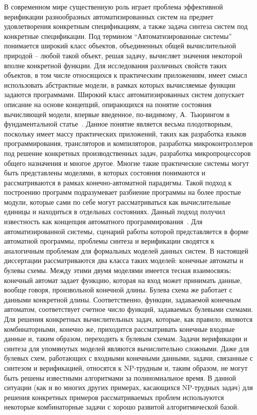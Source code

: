 \actuality
%
В современном мире существенную роль играет проблема эффективной верификации разнообразных автоматизированных систем на предмет удовлетворения конкретным спецификациям, а также задача синтеза систем под конкретные спецификации.
Под термином \enquote{Автоматизированные системы} понимается широкий класс объектов, объединенных общей вычислительной природой \--- любой такой объект, решая задачу, вычисляет значения некоторой вполне конкретной функции.
Для исследования различных свойств таких объектов, в том числе относящихся к практическим приложениям, имеет смысл использовать абстрактные модели, в рамках которых вычисляемые функции задаются программами.
Широкий класс автоматизированных систем допускает описание на основе концепций, опирающихся на понятие состояния вычисляющей модели, впервые введенное, по-видимому, А.~Тьюрингом в фундаментальной статье~\autocite{turing1937}.
Данное понятие является весьма плодотворным, поскольку имеет массу практических приложений, таких как разработка языков программирования, трансляторов и компиляторов, разработка микроконтроллеров под решение конкретных производственных задач, разработка микропроцессоров общего назначения и многое другое.
Многие такие практические системы могут быть представлены моделями, в которых состояния понимаются и рассматриваются в рамках конечно-автоматной парадигмы.
Такой подход к построению программ подразумевает разбиение программы на более простые модули, которые сами по себе могут рассматриваться как вычислительные единицы и находиться в отдельных состояниях. Данный подход получил известность как концепция автоматного программирования~\autocite{polikarpova2009}.
Для автоматизированной системы, сценарий работы которой представляется в форме автоматной программы, проблемы синтеза и верификации сводятся к аналогичным проблемам для формальных моделей данных систем. В настоящей диссертации рассматриваются два класса таких моделей: конечные автоматы и булевы схемы. Между этими двумя моделями имеется тесная взаимосвязь: конечный автомат задает функцию, которая на вход может принимать данные, вообще говоря, произвольной конечной длины. Булева схема же работает с данными конкретной длины. Соответственно, функции, задаваемой конечным автоматом, соответствует счетное число функций, задаваемых булевыми схемами. Для решения конкретных вычислительных задач, которые, как правило, являются комбинаторными, конечно же, приходится рассматривать конечные входные данные и, таким образом, переходить к булевым схемам. Задачи верификации и синтеза для упомянутых моделей являются вычислительно сложными. Даже для булевых схем, работающих с входными конечными данными, задачи, связанные с синтезом и верификацией, относятся к NP-трудным и, таким образом, не могут быть решены известными алгоритмами за полиномиальное время. В данной ситуации (как и во многих других примерах, касающихся NP-трудных задач) для решения конкретных примеров рассматриваемых проблем используются некоторые комбинаторные задачи с хорошо развитой алгоритмической базой.
